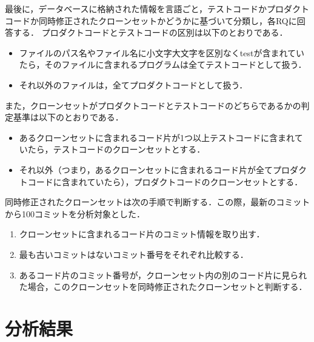 \documentclass[T,J]{fose}
\begin{document}
最後に，データベースに格納された情報を言語ごと，テストコードかプロダクトコードか同時修正されたクローンセットかどうかに基づいて分類し，各RQに回答する．
プロダクトコードとテストコードの区別は以下のとおりである．
\begin{itemize}
    \item ファイルのパス名やファイル名に小文字大文字を区別なく{\sf test}が含まれていたら，そのファイルに含まれるプログラムは全てテストコードとして扱う．
    \item それ以外のファイルは，全てプロダクトコードとして扱う．
\end{itemize}
また，クローンセットがプロダクトコードとテストコードのどちらであるかの判定基準は以下のとおりである．
\begin{itemize}
\item あるクローンセットに含まれるコード片が1つ以上テストコードに含まれていたら，テストコードのクローンセットとする．
\item それ以外（つまり，あるクローンセットに含まれるコード片が全てプロダクトコードに含まれていたら），プロダクトコードのクローンセットとする．
\end{itemize}
同時修正されたクローンセットは次の手順で判断する．この際，最新のコミットから100コミットを分析対象とした．
\begin{enumerate}
    \item クローンセットに含まれるコード片のコミット情報を取り出す．
    \item 最も古いコミットはないコミット番号をそれぞれ比較する．
    \item あるコード片のコミット番号が，クローンセット内の別のコード片に見られた場合，このクローンセットを同時修正されたクローンセットと判断する．
\end{enumerate}


\section{分析結果}
\end{document}
